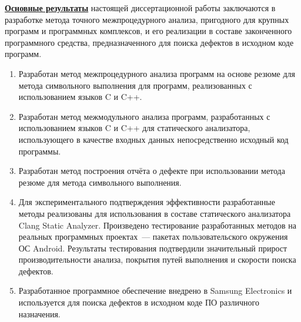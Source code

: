 \underline{\textbf{Основные результаты}} настоящей диссертационной работы заключаются в разработке метода точного межпроцедурного анализа, пригодного для крупных программ и программных комплексов, и его реализации в составе законченного программного средства, предназначенного для поиска дефектов в исходном коде программ.
\begin{enumerate}
  \item Разработан метод межпроцедурного анализа программ на основе резюме для метода символьного выполнения для программ, реализованных с использованием языков C и C++.
  \item Разработан метод межмодульного анализа программ, разработанных с использованием языков C и C++ для статического анализатора, использующего в качестве входных данных непосредственно исходный код программы.
  \item Разработан метод построения отчёта о дефекте при использовании метода резюме для метода символьного выполнения.
  \item Для экспериментального подтверждения эффективности разработанные методы реализованы для использования в составе статического анализатора Clang Static Analyzer. Произведено тестирование разработанных методов на реальных программных проектах~--- пакетах пользовательского окружения ОС Android. Результаты тестирования подтвердили значительный прирост производительности анализа, покрытия путей выполнения и скорости поиска дефектов.
  \item Разработанное программное обеспечение внедрено в Samsung Electronics и используется для поиска дефектов в исходном коде ПО различного назначения.
\end{enumerate}


\renewcommand{\refname}{\large Публикации автора по теме диссертации}
\insertbiblioauthor                          %
